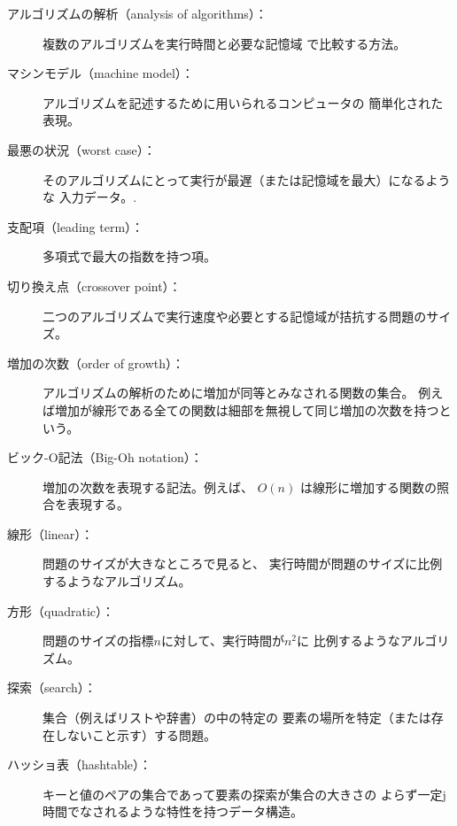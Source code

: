 \documentclass[a4j,12pt,makeidx]{jbook}
\begin{document}
\begin{description}

\item[アルゴリズムの解析（analysis of algorithms）：] 複数のアルゴリズムを実行時間と必要な記憶域
で比較する方法。

\item[マシンモデル（machine model）：] アルゴリズムを記述するために用いられるコンピュータの
簡単化された表現。

\item[最悪の状況（worst case）：] そのアルゴリズムにとって実行が最遅（または記憶域を最大）になるような
入力データ。.

\item[支配項（leading term）：] 多項式で最大の指数を持つ項。

\item[切り換え点（crossover point）：] 二つのアルゴリズムで実行速度や必要とする記憶域が拮抗する問題のサイズ。

\item[増加の次数（order of growth）：] アルゴリズムの解析のために増加が同等とみなされる関数の集合。
例えば増加が線形である全ての関数は細部を無視して同じ増加の次数を持つという。

\item[ビック-O記法（Big-Oh notation）：] 増加の次数を表現する記法。例えば、 $O(n)$
は線形に増加する関数の照合を表現する。

\item[線形（linear）：] 問題のサイズが大きなところで見ると、
実行時間が問題のサイズに比例するようなアルゴリズム。

\item[方形（quadratic）：] 問題のサイズの指標$n$に対して、実行時間が$n^2$に
比例するようなアルゴリズム。

\item[探索（search）：] 集合（例えばリストや辞書）の中の特定の
要素の場所を特定（または存在しないこと示す）する問題。

\item[ハッショ表（hashtable）：] キーと値のペアの集合であって要素の探索が集合の大きさの
よらず一定j時間でなされるような特性を持つデータ構造。

\end{description}
%
%
\end{document}
